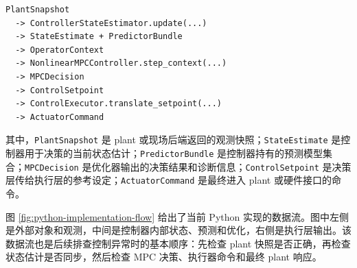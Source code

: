 \documentclass[UTF8,openany,zihao=-4,oneside]{ctexbook}
\providecommand{\passthrough}[1]{#1}
\begin{document}
\begin{lstlisting}
PlantSnapshot
  -> ControllerStateEstimator.update(...)
  -> StateEstimate + PredictorBundle
  -> OperatorContext
  -> NonlinearMPCController.step_context(...)
  -> MPCDecision
  -> ControlSetpoint
  -> ControlExecutor.translate_setpoint(...)
  -> ActuatorCommand
\end{lstlisting}

其中，\passthrough{\lstinline!PlantSnapshot!} 是 plant 或现场后端返回的观测快照；\passthrough{\lstinline!StateEstimate!} 是控制器用于决策的当前状态估计；\passthrough{\lstinline!PredictorBundle!} 是控制器持有的预测模型集合；\passthrough{\lstinline!MPCDecision!} 是优化器输出的决策结果和诊断信息；\passthrough{\lstinline!ControlSetpoint!} 是决策层传给执行层的参考设定；\passthrough{\lstinline!ActuatorCommand!} 是最终进入 plant 或硬件接口的命令。

图 \ref{fig:python-implementation-flow} 给出了当前 Python 实现的数据流。图中左侧是外部对象和观测，中间是控制器内部状态、预测和优化，右侧是执行层输出。该数据流也是后续排查控制异常时的基本顺序：先检查 plant 快照是否正确，再检查状态估计是否同步，然后检查 MPC 决策、执行器命令和最终 plant 响应。
\end{document}
